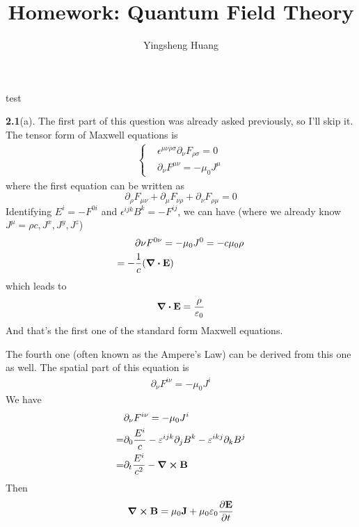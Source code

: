 \documentclass{article}
\title{Homework: Quantum Field Theory}
\author{Yingsheng Huang}
\begin{document}
\maketitle

test

{\bf2.1}\quad(a). The first part of this question was already asked previously, so I'll skip it. The tensor form of Maxwell equations is
\begin{align}
 \begin{cases}
   &\epsilon^{\mu\nu\rho\sigma}\partial_{\nu}F_{\rho\sigma}=0\\
   &\partial_{\nu}F^{\mu\nu}=-\mu_0J^{\mu}
 \end{cases}
\end{align}
where the first equation can be written as
\begin{equation*}
  \partial_{\rho}F_{\mu\nu}+\partial_{\mu}F_{\nu\rho}+\partial_{\nu}F_{\rho\mu}=0
\end{equation*}
Identifying $E^i=-F^{0i}$ and $\epsilon^{ijk}B^k=-F^{ij}$, we can have (where we already know $J^{\mu}={\rho c,J^x,J^y,J^z}$)
\begin{align*}
&\partial{\nu}F^{0\nu}=-\mu_0J^0=-c\mu_0\rho\\
=-&\frac{1}{c}(\div{\vb{E}})
\end{align*}
which leads to
\begin{align}
\div{\vb{E}}=\frac{\rho}{\varepsilon_0}
\end{align}
And that's the first one of the standard form Maxwell equations.

The fourth one (often known as the Ampere's Law) can be derived from this one as well. The spatial part of this equation is
\begin{align*}
\partial_{\nu}F^{i\nu}=-\mu_0J^i
\end{align*}
We have
\begin{align*}
  &\partial_{\nu}F^{i\nu}=-\mu_0J^i\\
  =&\partial_0\frac{E^i}{c}-\varepsilon^{ijk}\partial_jB^k-\varepsilon^{ikj}\partial_kB^j\\
  =&\partial_t\frac{E^i}{c^2}-\curl{\vb{B}}
\end{align*}
Then
\begin{align}
 \curl{\vb{B}}=\mu_0\vb{J}+\mu_0\varepsilon_0\pdv{\vb{E}}{t}
\end{align}
\end{document}
